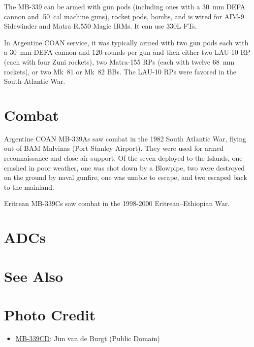 The MB-339 can be armed with gun pods (including ones with a 30~mm DEFA cannon and .50~cal machine guns), rocket pods, bombs, and is wired for AIM-9 Sidewinder and Matra R.550 Magic IRMs. It can use 330L FTs.

In Argentine COAN service, it was typically armed with two gun pods each with a 30~mm DEFA cannon and 120 rounds per gun and then either two LAU-10 RP (each with four Zuni rockets), two Matra-155 RPs (each with twelve 68~mm rockets), or two Mk~81 or Mk~82 BBs. The LAU-10 RPs were favored in the South Atlantic War.

\section{Combat}

Argentine COAN MB-339As saw combat in the 1982 South Atlantic War, flying out of BAM Malvinas (Port Stanley Airport). They were used for armed reconnaissance and close air support. Of the seven deployed to the Islands, one crashed in poor weather, one was shot down by a Blowpipe, two were destroyed on the ground by naval gunfire, one was unable to escape, and two escaped back to the mainland.

Eritrean MB-339Cs saw combat in the 1998-2000 Eritrean–Ethiopian War.

\section{ADCs}
\begin{adclist}
\end{adclist}

\section{See Also}
\begin{typelist}
\end{typelist}

\section{Photo Credit}
\begin{itemize}\raggedright
    \item \href{https://commons.wikimedia.org/wiki/File:61-160,_2007,_Italy,_Kleine-Brogel,_MB-339CD,_MM55088_-_1020400_(54042205628).jpg}{MB-339CD}: Jim van de Burgt (Public Domain)
\end{itemize}
